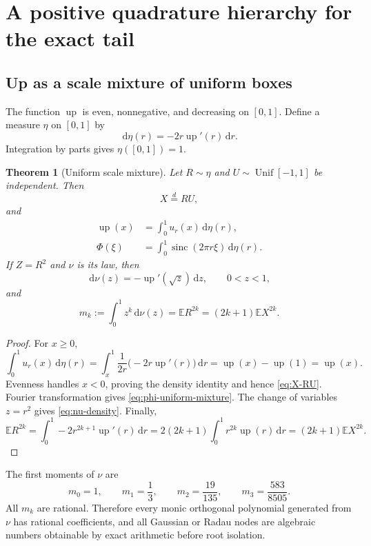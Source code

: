 \documentclass[11pt]{article}
\newtheorem{theorem}{Theorem}[section]
\theoremstyle{definition}
\theoremstyle{remark}
\newcommand{\E}{\mathbb E}
\newcommand{\Up}{\operatorname{up}}
\newcommand{\sinc}{\operatorname{sinc}}
\newcommand{\dd}{\,\mathrm d}
\begin{document}
\section{A positive quadrature hierarchy for the exact tail}
\label{sec:positive}

\subsection{Up as a scale mixture of uniform boxes}

The function $\Up$ is even, nonnegative, and decreasing on $[0,1]$.  Define a measure
$\eta$ on $[0,1]$ by
\begin{equation}
 \dd\eta(r)=-2r\Up'(r)\dd r.
 \label{eq:eta}
\end{equation}
Integration by parts gives $\eta([0,1])=1$.

\begin{theorem}[Uniform scale mixture]
\label{thm:scale-mixture}
Let $R\sim\eta$ and $U\sim\operatorname{Unif}[-1,1]$ be independent.  Then
\begin{equation}
 X\overset d=RU,
 \label{eq:X-RU}
\end{equation}
and
\begin{align}
 \Up(x)&=\int_0^1u_r(x)\dd\eta(r),
 \label{eq:up-uniform-mixture}\\
 \Phi(\xi)&=\int_0^1\sinc(2\pi r\xi)\dd\eta(r).
 \label{eq:phi-uniform-mixture}
\end{align}
If $Z=R^2$ and $\nu$ is its law, then
\begin{equation}
 \dd\nu(z)=-\Up'(\sqrt z)\dd z,
 \qquad 0<z<1,
 \label{eq:nu-density}
\end{equation}
and
\begin{equation}
 m_k:=\int_0^1z^k\dd\nu(z)
 =\E R^{2k}=(2k+1)\E X^{2k}.
 \label{eq:nu-moments}
\end{equation}
\end{theorem}

\begin{proof}
For $x\ge0$,
\[
 \int_0^1u_r(x)\dd\eta(r)
 =\int_x^1\frac{1}{2r}\bigl(-2r\Up'(r)\bigr)\dd r
 =\Up(x)-\Up(1)=\Up(x).
\]
Evenness handles $x<0$, proving the density identity and hence \cref{eq:X-RU}.
Fourier transformation gives \cref{eq:phi-uniform-mixture}.  The change of variables
$z=r^2$ gives \cref{eq:nu-density}.  Finally,
\[
 \E R^{2k}=\int_0^1-2r^{2k+1}\Up'(r)\dd r
 =2(2k+1)\int_0^1r^{2k}\Up(r)\dd r
 =(2k+1)\E X^{2k}.
\]
\end{proof}

The first moments of $\nu$ are
\begin{equation}
 m_0=1,
 \qquad m_1=\frac13,
 \qquad m_2=\frac{19}{135},
 \qquad m_3=\frac{583}{8505}.
 \label{eq:nu-first-moments}
\end{equation}
All $m_k$ are rational.  Therefore every monic orthogonal polynomial generated from
$\nu$ has rational coefficients, and all Gaussian or Radau nodes are algebraic numbers
obtainable by exact arithmetic before root isolation.
\end{document}
